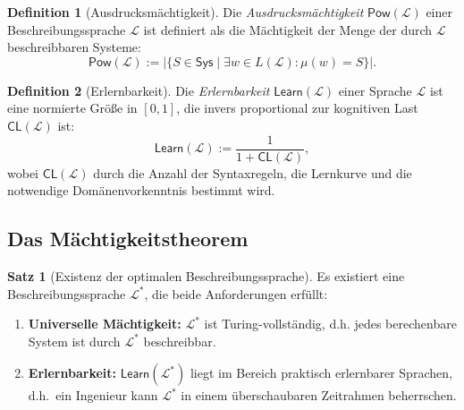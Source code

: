 ﻿\documentclass[a4paper,12pt]{article}
\theoremstyle{definition}
\newtheorem{definition}{Definition}
\newtheorem{satz}{Satz}
\begin{document}
\begin{definition}[Ausdrucksmächtigkeit]
\label{def:maechtigkeit}
Die \emph{Ausdrucksmächtigkeit} $\mathsf{Pow}(\mathcal{L})$ einer Beschreibungssprache
$\mathcal{L}$ ist definiert als die Mächtigkeit der Menge der durch $\mathcal{L}$
beschreibbaren Systeme:
\[
  \mathsf{Pow}(\mathcal{L}) := |\{S \in \mathsf{Sys} \mid \exists w \in L(\mathcal{L}): \mu(w) = S\}|.
\]
\end{definition}

\begin{definition}[Erlernbarkeit]
\label{def:erlernbarkeit}
Die \emph{Erlernbarkeit} $\mathsf{Learn}(\mathcal{L})$ einer Sprache $\mathcal{L}$ ist eine
normierte Größe in $[0, 1]$, die invers proportional zur kognitiven Last
$\mathsf{CL}(\mathcal{L})$ ist:
\[
  \mathsf{Learn}(\mathcal{L}) := \frac{1}{1 + \mathsf{CL}(\mathcal{L})},
\]
wobei $\mathsf{CL}(\mathcal{L})$ durch die Anzahl der Syntaxregeln, die
Lernkurve und die notwendige Domänenvorkenntnis bestimmt wird.
\end{definition}

\subsection{Das Mächtigkeitstheorem}

\begin{satz}[Existenz der optimalen Beschreibungssprache]
\label{satz:optsprache}
Es existiert eine Beschreibungssprache $\mathcal{L}^*$, die beide Anforderungen erfüllt:
\begin{enumerate}
  \item \textbf{Universelle Mächtigkeit:} $\mathcal{L}^*$ ist Turing-vollständig, d.h.
        jedes berechenbare System ist durch $\mathcal{L}^*$ beschreibbar.
  \item \textbf{Erlernbarkeit:} $\mathsf{Learn}(\mathcal{L}^*)$ liegt im Bereich
        praktisch erlernbarer Sprachen, d.h.\ ein Ingenieur kann $\mathcal{L}^*$ in
        einem überschaubaren Zeitrahmen beherrschen.
\end{enumerate}
\end{satz}
\end{document}
